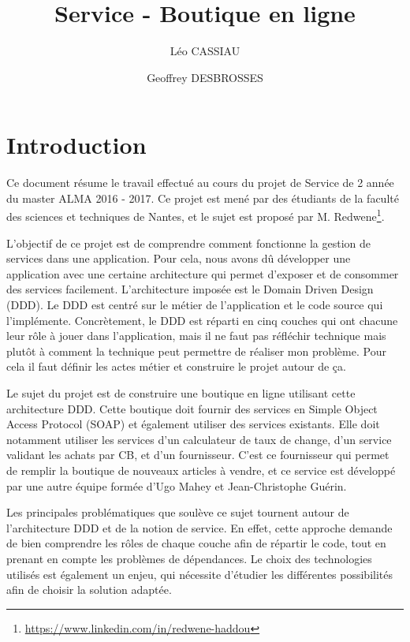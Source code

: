 \documentclass[a4paper]{article}
\title{Service - Boutique en ligne}
\author{Léo CASSIAU \and Geoffrey DESBROSSES}
\begin{document}
\maketitle

\section{Introduction}

    Ce document résume le travail effectué au cours du projet de Service de 2\ieme{} année du master ALMA 2016 - 2017. Ce projet est mené par des étudiants de la faculté des sciences et techniques de Nantes, et le sujet est proposé par M. Redwene\footnote{\url{https://www.linkedin.com/in/redwene-haddou}}.
    
    \bigskip
    
    L'objectif de ce projet est de comprendre comment fonctionne la gestion de services dans une application. Pour cela, nous avons dû développer une application avec une certaine architecture qui permet d'exposer et de consommer des services facilement. L'architecture imposée est le Domain Driven Design (DDD). Le DDD est centré sur le métier de l’application et le code source qui l’implémente. Concrètement, le DDD est réparti en cinq couches qui ont chacune leur rôle à jouer dans l'application, mais il ne faut pas réfléchir technique mais plutôt à comment la technique peut permettre de réaliser mon problème. Pour cela il faut définir les actes métier et construire le projet autour de ça.

    \bigskip
    
    Le sujet du projet est de construire une boutique en ligne utilisant cette architecture DDD. Cette boutique doit fournir des services en Simple Object Access Protocol (SOAP) et également utiliser des services existants. Elle doit notamment utiliser les services d'un calculateur de taux de change, d'un service validant les achats par CB, et d'un fournisseur. C'est ce fournisseur qui permet de remplir la boutique de nouveaux articles à vendre, et ce service est développé par une autre équipe formée d'Ugo Mahey et Jean-Christophe Guérin. 
    
    \bigskip
    
    Les principales problématiques que soulève ce sujet tournent autour de l'architecture DDD et de la notion de service. En effet, cette approche demande de bien comprendre les rôles de chaque couche afin de répartir le code, tout en prenant en compte les problèmes de dépendances. Le choix des technologies utilisés est également un enjeu, qui nécessite d'étudier les différentes possibilités afin de choisir la solution adaptée.
    
\end{document}
